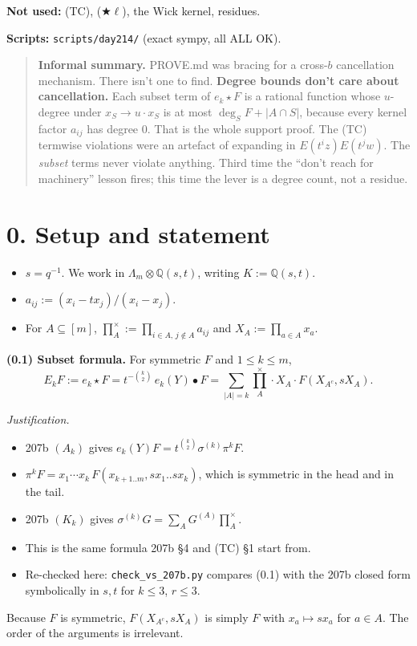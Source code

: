 \documentclass[11pt]{article}
\theoremstyle{definition}
\newcommand{\Q}{\mathbb{Q}}
\newcommand{\prodx}{\textstyle\prod^{\times}}
\newcommand{\file}[1]{\texttt{#1}}
\begin{document}
\noindent\textbf{Not used:} (TC), ($\bigstar\ell$), the Wick kernel, residues.

\noindent\textbf{Scripts:} \file{scripts/day214/} (exact sympy, all ALL OK).

\begin{quote}
\textbf{Informal summary.} PROVE.md was bracing for a cross-$b$ cancellation mechanism. There isn't one to find. \textbf{Degree bounds don't care about cancellation.} Each subset term of $e_k\star F$ is a rational function whose $u$-degree under $x_S \to u\cdot x_S$ is at most $\deg_S F + |A\cap S|$, because every kernel factor $a_{ij}$ has degree $0$. That is the whole support proof. The (TC) termwise violations were an artefact of expanding in $E(t^iz)E(t^jw)$. The \emph{subset} terms never violate anything. Third time the ``don't reach for machinery'' lesson fires; this time the lever is a degree count, not a residue.
\end{quote}

\section*{0. Setup and statement}

\begin{itemize}
\item $s = q^{-1}$. We work in $\Lambda_m \otimes \Q(s,t)$, writing $K := \Q(s,t)$.
\item $a_{ij} := (x_i - t x_j)/(x_i - x_j)$.
\item For $A \subseteq [m]$, $\prodx_A := \prod_{i\in A,\, j\notin A} a_{ij}$ and $X_A := \prod_{a\in A} x_a$.
\end{itemize}

\noindent\textbf{(0.1) Subset formula.} For symmetric $F$ and $1 \le k \le m$,
\[
E_k F := e_k\star F = t^{-\binom{k}{2}}\, e_k(Y)\bullet F = \sum_{|A|=k} \prodx_A \cdot X_A \cdot F(X_{A^c}, sX_A). \tag{0.1}
\]

\noindent\emph{Justification.}
\begin{itemize}
\item 207b $(A_k)$ gives $e_k(Y)F = t^{\binom{k}{2}} \sigma^{(k)} \pi^k F$.
\item $\pi^k F = x_1\cdots x_k\, F(x_{k+1..m}, s x_1..s x_k)$, which is symmetric in the head and in the tail.
\item 207b $(K_k)$ gives $\sigma^{(k)}G = \sum_A G^{(A)} \prodx_A$.
\item This is the same formula 207b \S4 and (TC) \S1 start from.
\item Re-checked here: \file{check\_vs\_207b.py} compares (0.1) with the 207b closed form symbolically in $s,t$ for $k \le 3$, $r \le 3$.
\end{itemize}
Because $F$ is symmetric, $F(X_{A^c}, sX_A)$ is simply $F$ with $x_a \mapsto s x_a$ for $a \in A$. The order of the arguments is irrelevant.
\end{document}
